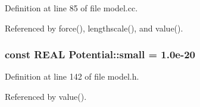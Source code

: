 Definition at line 85 of file model.cc.

Referenced by force(), lengthscale(), and value().\hypertarget{namespacePotential_556740887ab207a8ffabed2dd038e04e}{
\subsubsection[{small}]{\setlength{\rightskip}{0pt plus 5cm}const REAL {\bf Potential::small} = 1.0e-20}}
\label{namespacePotential_556740887ab207a8ffabed2dd038e04e}




Definition at line 142 of file model.h.

Referenced by value().